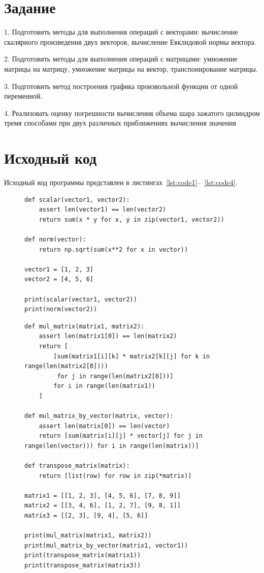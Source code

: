 \documentclass[a4paper, 14pt]{extarticle}
\begin{document}
\renewcommand{\ttdefault}{pcr}

\setlength{\tabcolsep}{3pt}
\newpage
\setcounter{page}{2}

\section{Задание}\label{Sect::task}
1. Подготовить методы для выполнения операций с векторами: вычисление
скалярного произведения двух векторов, вычисление Евклидовой нормы
вектора.

2. Подготовить методы для выполнения операций с матрицами: умножение
матрицы на матрицу, умножение матрицы на вектор, транспонирование
матрицы.

3. Подготовить метод построения графика произвольной функции от одной
переменной.

4. Реализовать оценку погрешности вычисления объема шара зажатого цилиндром тремя способами при двух различных приближениях вычисления значения
\newpage
\section{Исходный код}

Исходный код программы представлен в листингах~\ref{lst:code1}--~\ref{lst:code4}.

\begin{figure}[H]
\begin{lstlisting}[language={},caption={Операции над векторами},label={lst:code1}]
def scalar(vector1, vector2):
    assert len(vector1) == len(vector2)
    return sum(x * y for x, y in zip(vector1, vector2))

def norm(vector):
    return np.sqrt(sum(x**2 for x in vector))

vector1 = [1, 2, 3]
vector2 = [4, 5, 6]

print(scalar(vector1, vector2))
print(norm(vector2))
\end{lstlisting}
\end{figure}

\begin{figure}[H]
\begin{lstlisting}[language={},caption={Операции над матрицами},label={lst:code2}]
def mul_matrix(matrix1, matrix2):
    assert len(matrix1[0]) == len(matrix2)
    return [
        [sum(matrix1[i][k] * matrix2[k][j] for k in range(len(matrix2[0])))
         for j in range(len(matrix2[0]))]
        for i in range(len(matrix1))
    ]

def mul_matrix_by_vector(matrix, vector):
    assert len(matrix[0]) == len(vector)
    return [sum(matrix[i][j] * vector[j] for j in range(len(vector))) for i in range(len(matrix))]

def transpose_matrix(matrix):
    return [list(row) for row in zip(*matrix)]

matrix1 = [[1, 2, 3], [4, 5, 6], [7, 8, 9]]
matrix2 = [[3, 4, 6], [1, 2, 7], [9, 8, 1]]
matrix3 = [[2, 3], [9, 4], [5, 6]]

print(mul_matrix(matrix1, matrix2))
print(mul_matrix_by_vector(matrix1, vector1))
print(transpose_matrix(matrix1))
print(transpose_matrix(matrix3))
\end{lstlisting}
\end{figure}
\end{document}
